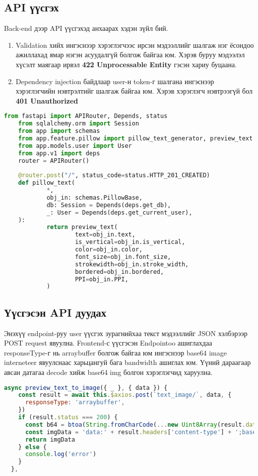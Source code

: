 \subsection{API үүсгэх}
Back-end дээр API үүсгэхэд анхаарах хэдэн зүйл бий.
\begin{enumerate}
	\item Validation хийх ингэснээр хэрэглэгчээс ирсэн мэдээллийг шалгаж нэг ёсондоо ажиллахад  ямар нэгэн асуудалгүй болгож байгаа юм. Хэрэв буруу мэдээлэл хүсэлт маягаар ирвэл \textbf{
		      422 Unprocessable Entity}
	      гэсэн хариу буцаана.
	\item Dependency injection байдлаар user-н token-г шалгана ингэснээр хэрэглэгчийн нэвтрэлтийг шалгаж байгаа юм. Хэрэв хэрэглэгч нэвтрээгүй бол \textbf{
		      401 Unauthorized}
\end{enumerate}
\begin{lstlisting}[language=Python,caption={Зураг буцаан user-лүү илгээх endpoint},frame=single]
	from fastapi import APIRouter, Depends, status
	from sqlalchemy.orm import Session
	from app import schemas
	from app.feature.pillow import pillow_text_generator, preview_text
	from app.models.user import User
	from app.v1 import deps
	router = APIRouter()
	
	@router.post("/", status_code=status.HTTP_201_CREATED)
	def pillow_text(
			*,
			obj_in: schemas.PillowBase,
			db: Session = Depends(deps.get_db),
			_: User = Depends(deps.get_current_user),
	):
			return preview_text(
					text=obj_in.text,
					is_vertical=obj_in.is_vertical,
					color=obj_in.color,
					font_size=obj_in.font_size,
					strokewidth=obj_in.stroke_width,
					bordered=obj_in.bordered,
					PPI=obj_in.PPI,
			)
	\end{lstlisting}

\subsection{Үүсгэсэн API дуудах}
Энэхүү endpoint-руу user үүсгэх зурагнийхаа текст мэдээллийг JSON хэлбэрээр POST request явуулна. Frontend-с үүсгэсэн Endpointoo ашиглахдаа responseType-г нь arraybuffer болгож байгаа юм ингэснээр base64 image interneteer явуулснаас харьцангуй бага bandwidth ашиглах юм. Үүний дараагаар авсан датагаа decode хийж base64 img болгон хэрэглэгчид харуулна.


\begin{lstlisting}[language=JavaScript,caption={Endpoint дуудах function},frame=single]
	async preview_text_to_image({ _ }, { data }) {
    const result = await this.$axios.post(`text_image/`, data, {
      responseType: 'arraybuffer',
    })
    if (result.status === 200) {
      const b64 = btoa(String.fromCharCode(...new Uint8Array(result.data)))
      const imgData = 'data:' + result.headers['content-type'] + ';base64,' + b64
      return imgData
    } else {
      console.log('error')
    }
  },
\end{lstlisting}


